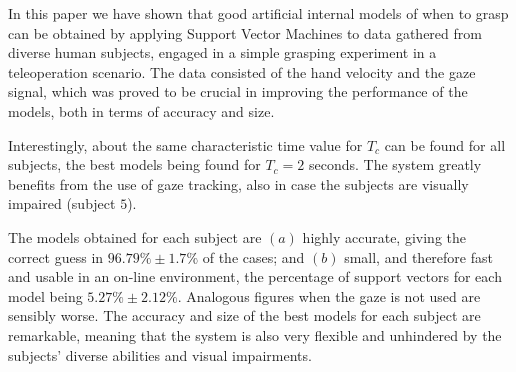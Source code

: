In this paper we have shown that good artificial internal models of
when to grasp can be obtained by applying Support Vector Machines to
data gathered from diverse human subjects, engaged in a simple
grasping experiment in a teleoperation scenario. The data consisted of
the hand velocity and the gaze signal, which was proved to be crucial
in improving the performance of the models, both in terms of accuracy
and size.

Interestingly, about the same characteristic time value for $T_c$ can
be found for all subjects, the best models being found for $T_c=2$
seconds. The system greatly benefits from the use of gaze tracking,
also in case the subjects are visually impaired (subject $5$).

The models obtained for each subject are $(a)$ highly accurate, giving
the correct guess in $96.79\% \pm 1.7\%$ of the cases; and $(b)$
small, and therefore fast and usable in an on-line environment, the
percentage of support vectors for each model being $5.27\% \pm
2.12\%$. Analogous figures when the gaze is not used are sensibly
worse. The accuracy and size of the best models for each subject are
remarkable, meaning that the system is also very flexible and
unhindered by the subjects' diverse abilities and visual impairments.
